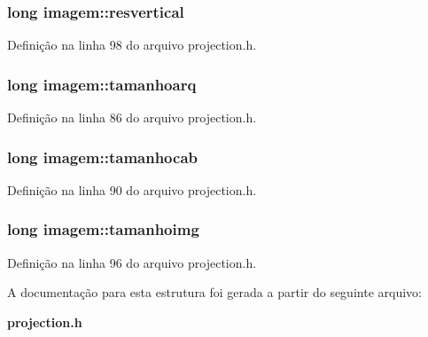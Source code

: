 \subsubsection[{resvertical}]{\setlength{\rightskip}{0pt plus 5cm}long imagem\+::resvertical}\label{structimagem_a272fba37f91275023b7b20e2cd65fbb9}


Definição na linha 98 do arquivo projection.\+h.

\subsubsection[{tamanhoarq}]{\setlength{\rightskip}{0pt plus 5cm}long imagem\+::tamanhoarq}\label{structimagem_a6210d1f161ced89be5f540a162536a69}


Definição na linha 86 do arquivo projection.\+h.

\subsubsection[{tamanhocab}]{\setlength{\rightskip}{0pt plus 5cm}long imagem\+::tamanhocab}\label{structimagem_addbbda90e1e20814099e56c6762129f6}


Definição na linha 90 do arquivo projection.\+h.

\subsubsection[{tamanhoimg}]{\setlength{\rightskip}{0pt plus 5cm}long imagem\+::tamanhoimg}\label{structimagem_abcdce5032cb015e1be29a1db8b67f413}


Definição na linha 96 do arquivo projection.\+h.



A documentação para esta estrutura foi gerada a partir do seguinte arquivo\+:\begin{DoxyCompactItemize}
\item 
{\bf projection.\+h}\end{DoxyCompactItemize}
